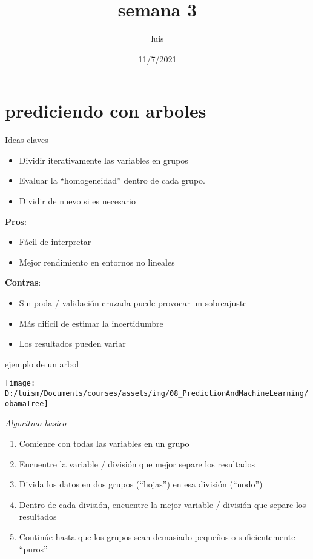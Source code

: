 \documentclass[
]{article}
\title{semana 3}
\author{luis}
\date{11/7/2021}
\providecommand{\tightlist}{%
  \setlength{\itemsep}{0pt}\setlength{\parskip}{0pt}}
\begin{document}
\maketitle

\tableofcontents

\hypertarget{prediciendo-con-arboles}{%
\section{prediciendo con arboles}\label{prediciendo-con-arboles}}

Ideas claves

\begin{itemize}
\tightlist
\item
  Dividir iterativamente las variables en grupos
\item
  Evaluar la ``homogeneidad'' dentro de cada grupo.
\item
  Dividir de nuevo si es necesario
\end{itemize}

\textbf{Pros}:

\begin{itemize}
\tightlist
\item
  Fácil de interpretar
\item
  Mejor rendimiento en entornos no lineales
\end{itemize}

\textbf{Contras}:

\begin{itemize}
\tightlist
\item
  Sin poda / validación cruzada puede provocar un sobreajuste
\item
  Más difícil de estimar la incertidumbre
\item
  Los resultados pueden variar
\end{itemize}

ejemplo de un arbol

\begin{center}\texttt{[image: D:/luism/Documents/courses/assets/img/08\_PredictionAndMachineLearning/obamaTree]} \end{center}

\emph{Algoritmo basico}

\begin{enumerate}
\def\labelenumi{\arabic{enumi}.}
\tightlist
\item
  Comience con todas las variables en un grupo
\item
  Encuentre la variable / división que mejor separe los resultados
\item
  Divida los datos en dos grupos (``hojas'') en esa división (``nodo'')
\item
  Dentro de cada división, encuentre la mejor variable / división que
  separe los resultados
\item
  Continúe hasta que los grupos sean demasiado pequeños o
  suficientemente ``puros''
\end{enumerate}
\end{document}
